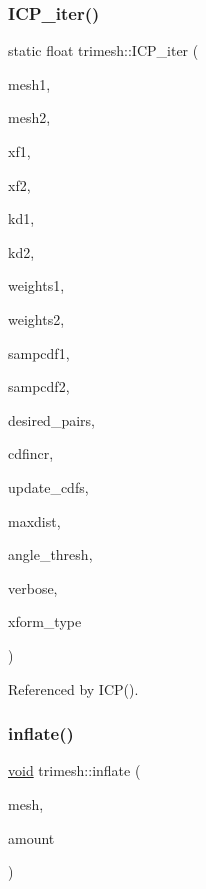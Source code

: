\subsubsection{\texorpdfstring{I\+C\+P\+\_\+iter()}{ICP\_iter()}}
{\footnotesize\ttfamily static float trimesh\+::\+I\+C\+P\+\_\+iter (\begin{DoxyParamCaption}\item[{\hyperlink{classtrimesh_1_1TriMesh}{Tri\+Mesh} $\ast$}]{mesh1,  }\item[{\hyperlink{classtrimesh_1_1TriMesh}{Tri\+Mesh} $\ast$}]{mesh2,  }\item[{const \hyperlink{namespacetrimesh_ad504958f2f56e393991b848986a8459f}{xform} \&}]{xf1,  }\item[{\hyperlink{namespacetrimesh_ad504958f2f56e393991b848986a8459f}{xform} \&}]{xf2,  }\item[{const \hyperlink{classtrimesh_1_1KDtree}{K\+Dtree} $\ast$}]{kd1,  }\item[{const \hyperlink{classtrimesh_1_1KDtree}{K\+Dtree} $\ast$}]{kd2,  }\item[{const vector$<$ float $>$ \&}]{weights1,  }\item[{const vector$<$ float $>$ \&}]{weights2,  }\item[{vector$<$ float $>$ \&}]{sampcdf1,  }\item[{vector$<$ float $>$ \&}]{sampcdf2,  }\item[{int}]{desired\+\_\+pairs,  }\item[{float \&}]{cdfincr,  }\item[{bool}]{update\+\_\+cdfs,  }\item[{float \&}]{maxdist,  }\item[{float \&}]{angle\+\_\+thresh,  }\item[{int}]{verbose,  }\item[{\hyperlink{namespacetrimesh_a64c747e4228158428e9cd911672cb1be}{I\+C\+P\+\_\+xform\+\_\+type}}]{xform\+\_\+type }\end{DoxyParamCaption})\hspace{0.3cm}{\ttfamily [static]}}



Referenced by I\+C\+P().

\mbox{\label{namespacetrimesh_aa066982422b3d01638abe8e043d85839}} 
\subsubsection{\texorpdfstring{inflate()}{inflate()}}
{\footnotesize\ttfamily \hyperlink{namespacetrimesh_a784ddfd979e1c579bda795a8edfc3f43}{void} trimesh\+::inflate (\begin{DoxyParamCaption}\item[{\hyperlink{classtrimesh_1_1TriMesh}{Tri\+Mesh} $\ast$}]{mesh,  }\item[{float}]{amount }\end{DoxyParamCaption})}

